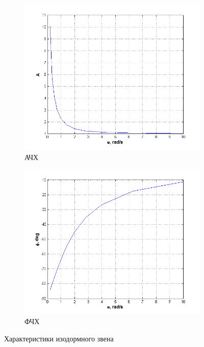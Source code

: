 \documentclass[a4paper, 11pt, russian]{article}
\begin{document}
\begin{figure}[ht!]
        \begin{subfigure}[h]{0.48\textwidth}
            \includegraphics[width = \textwidth]{isodromusLinkAFR}
            \caption{АЧХ}
        \end{subfigure}
        \hfill
        \begin{subfigure}[h]{0.48\textwidth}
            \includegraphics[width = \textwidth]{isodromusLinkPFR}
            \caption{ФЧХ}
        \end{subfigure}
        \caption{Характеристики изодормного звена}
    \end{figure}
\end{document}
